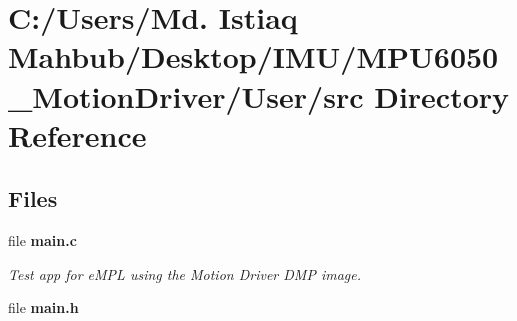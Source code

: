 \section{C\+:/\+Users/\+Md. Istiaq Mahbub/\+Desktop/\+I\+M\+U/\+M\+P\+U6050\+\_\+\+Motion\+Driver/\+User/src Directory Reference}
\label{dir_5a0bf39bc2d16d6d0bcf887611058439}
\subsection*{Files}
\begin{DoxyCompactItemize}
\item 
file \textbf{ main.\+c}
\begin{DoxyCompactList}\small\item\em Test app for e\+M\+PL using the Motion Driver D\+MP image. \end{DoxyCompactList}\item 
file \textbf{ main.\+h}
\end{DoxyCompactItemize}
